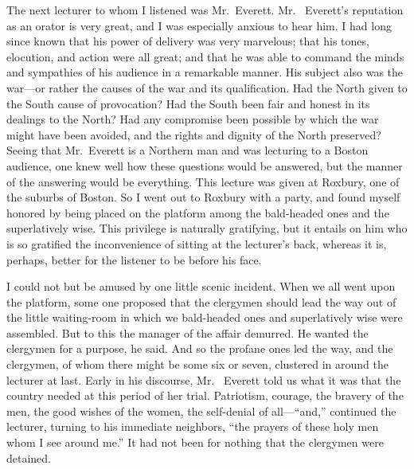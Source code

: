 The next lecturer to whom I listened was Mr.\ Everett.  Mr.\ %
Everett's reputation as an orator is very great, and I was
especially anxious to hear him.  I had long since known that his
power of delivery was very marvelous; that his tones, elocution,
and action were all great; and that he was able to command the
minds and sympathies of his audience in a remarkable manner.  His
subject also was the war---or rather the causes of the war and its
qualification.  Had the North given to the South cause of
provocation?  Had the South been fair and honest in its dealings to
the North?  Had any compromise been possible by which the war might
have been avoided, and the rights and dignity of the North
preserved?  Seeing that Mr.\ Everett is a Northern man and was
lecturing to a Boston audience, one knew well how these questions
would be answered, but the manner of the answering would be
everything.  This lecture was given at Roxbury, one of the suburbs
of Boston.  So I went out to Roxbury with a party, and found myself
honored by being placed on the platform among the bald-headed ones
and the superlatively wise.  This privilege is naturally
gratifying, but it entails on him who is so gratified the
inconvenience of sitting at the lecturer's back, whereas it is,
perhaps, better for the listener to be before his face.

I could not but be amused by one little scenic incident.  When we
all went upon the platform, some one proposed that the clergymen
should lead the way out of the little waiting-room in which we
bald-headed ones and superlatively wise were assembled.  But to
this the manager of the affair demurred.  He wanted the clergymen
for a purpose, he said.  And so the profane ones led the way, and
the clergymen, of whom there might be some six or seven, clustered
in around the lecturer at last.  Early in his discourse, Mr.\ %
Everett told us what it was that the country needed at this period
of her trial.  Patriotism, courage, the bravery of the men, the
good wishes of the women, the self-denial of all---``and,'' continued
the lecturer, turning to his immediate neighbors, ``the prayers of
these holy men whom I see around me.''  It had not been for nothing
that the clergymen were detained.

